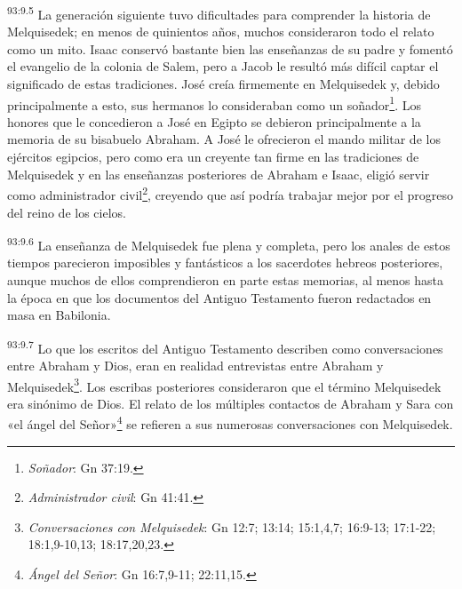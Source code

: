 \par
\textsuperscript{93:9.5} La generación siguiente tuvo dificultades para comprender la historia de Melquisedek; en menos de quinientos años, muchos consideraron todo el relato como un mito. Isaac conservó bastante bien las enseñanzas de su padre y fomentó el evangelio de la colonia de Salem, pero a Jacob le resultó más difícil captar el significado de estas tradiciones. José creía firmemente en Melquisedek y, debido principalmente a esto, sus hermanos lo consideraban como un soñador\footnote{\textit{Soñador}: Gn 37:19.}. Los honores que le concedieron a José en Egipto se debieron principalmente a la memoria de su bisabuelo Abraham. A José le ofrecieron el mando militar de los ejércitos egipcios, pero como era un creyente tan firme en las tradiciones de Melquisedek y en las enseñanzas posteriores de Abraham e Isaac, eligió servir como administrador civil\footnote{\textit{Administrador civil}: Gn 41:41.}, creyendo que así podría trabajar mejor por el progreso del reino de los cielos.

\par
\textsuperscript{93:9.6} La enseñanza de Melquisedek fue plena y completa, pero los anales de estos tiempos parecieron imposibles y fantásticos a los sacerdotes hebreos posteriores, aunque muchos de ellos comprendieron en parte estas memorias, al menos hasta la época en que los documentos del Antiguo Testamento fueron redactados en masa en Babilonia.

\par
\textsuperscript{93:9.7} Lo que los escritos del Antiguo Testamento describen como conversaciones entre Abraham y Dios, eran en realidad entrevistas entre Abraham y Melquisedek\footnote{\textit{Conversaciones con Melquisedek}: Gn 12:7; 13:14; 15:1,4,7; 16:9-13; 17:1-22; 18:1,9-10,13; 18:17,20,23.}. Los escribas posteriores consideraron que el término Melquisedek era sinónimo de Dios. El relato de los múltiples contactos de Abraham y Sara con «el ángel del Señor»\footnote{\textit{Ángel del Señor}: Gn 16:7,9-11; 22:11,15.} se refieren a sus numerosas conversaciones con Melquisedek.


